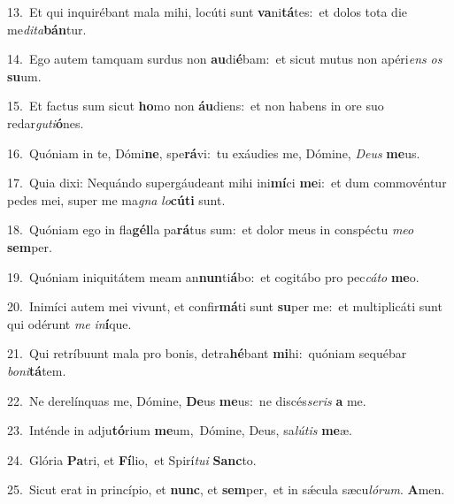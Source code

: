 {\numbfont\textcolor{\numbcolor}{13.}}~Et qui inquirébant mala mihi, locúti sunt \textbf{va}\-ni\-\textbf{tá}\-tes:~\star et dolos tota die me\-\textit{di}\-\textit{ta}\textbf{bán}tur.\par
{\numbfont\textcolor{\numbcolor}{14.}}~Ego autem tamquam surdus non \textbf{au}\-di\-\textbf{é}\-bam:~\star et sicut mutus non apéri\textit{ens} \textit{os} \textbf{su}\-um.\par
{\numbfont\textcolor{\numbcolor}{15.}}~Et factus sum sicut \textbf{ho}\-mo non \textbf{áu}\-diens:~\star et non habens in ore suo redar\-\textit{gu}\-\textit{ti}\textbf{ó}nes.\par
{\numbfont\textcolor{\numbcolor}{16.}}~Quóniam in te, Dómi\-\textbf{ne}\-, spe\-\textbf{rá}\-vi:~\star tu exáudies me, Dómine, \textit{De}\-\textit{us} \textbf{me}\-us.\par
{\numbfont\textcolor{\numbcolor}{17.}}~Quia dixi: Nequándo supergáudeant mihi ini\-\textbf{mí}\-ci \textbf{me}\-i:~\star et dum commovéntur pedes mei, super me ma\textit{gna} \textit{lo}\-\textbf{cú}\textbf{ti} sunt.\par
{\numbfont\textcolor{\numbcolor}{18.}}~Quóniam ego in fla\-\textbf{gél}\-la pa\-\textbf{rá}\-tus sum:~\star et dolor meus in conspéctu \textit{me}\-\textit{o} \textbf{sem}\-per.\par
{\numbfont\textcolor{\numbcolor}{19.}}~Quóniam iniquitátem meam an\-\textbf{nun}\-ti\-\textbf{á}\-bo:~\star et cogitábo pro pec\-\textit{cá}\-\textit{to} \textbf{me}\-o.\par
{\numbfont\textcolor{\numbcolor}{20.}}~Inimíci autem mei vivunt, et confir\-\textbf{má}\-ti sunt \textbf{su}\-per me:~\star et multiplicáti sunt qui odérunt \textit{me} \textit{in}\-\textbf{í}que.\par
{\numbfont\textcolor{\numbcolor}{21.}}~Qui retríbuunt mala pro bonis, detra\-\textbf{hé}\-bant \textbf{mi}\-hi:~\star quóniam sequébar \textit{bo}\-\textit{ni}\textbf{tá}tem.\par
{\numbfont\textcolor{\numbcolor}{22.}}~Ne derelínquas me, Dómine, \textbf{De}\-us \textbf{me}\-us:~\star ne discés\-\textit{se}\-\textit{ris} \textbf{a} me.\par
{\numbfont\textcolor{\numbcolor}{23.}}~Inténde in adju\-\textbf{tó}\-rium \textbf{me}\-um,~\star Dómine, Deus, sa\-\textit{lú}\-\textit{tis} \textbf{me}\-æ.\par
{\numbfont\textcolor{\numbcolor}{24.}}~Glória \textbf{Pa}\-tri, et \textbf{Fí}\-lio,~\star et Spirí\-\textit{tu}\-\textit{i} \textbf{Sanc}\-to.\par
{\numbfont\textcolor{\numbcolor}{25.}}~Sicut erat in princípio, et \textbf{nunc}\-, et \textbf{sem}\-per,~\star et in sǽcula sæcu\-\textit{ló}\-\textit{rum}. \textbf{A}\-men.\par

